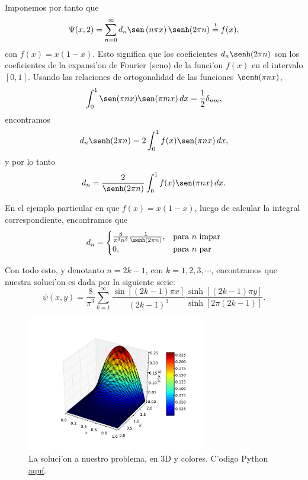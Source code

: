 Imponemos por tanto que
\begin{equation}
\Psi(x,2) = \sum_{n=0}^\infty d_n \sen\left(n\pi x\right)\senh(2\pi n) \stackrel{!}{=} f(x),
\end{equation}
con $f(x)=x(1-x)$. Esto significa que los coeficientes $d_n\senh(2\pi n)$ son los coeficientes de la expansi'on de Fourier (seno) de la funci'on $f(x)$ en el intervalo $[0,1]$. Usando las relaciones de ortogonalidad de las funciones $\senh(\pi nx)$, 
\begin{equation}
\int_0^1 \sen(\pi nx)\sen(\pi mx)\,dx = \frac{1}{2}\delta_{nm},
\end{equation}
encontramos
\begin{equation}
d_n\senh(2\pi n) = 2 \int_0^1 f(x)\sen(\pi nx)\,dx,
\end{equation}
y por lo tanto
\begin{equation}
d_n = \frac{2}{\senh(2\pi n)} \int_0^1 f(x)\sen(\pi nx)\,dx.
\end{equation}

En el ejemplo particular en que $f(x)=x(1-x)$, luego de calcular la integral correspondiente, encontramos que
\begin{equation}
d_n = \begin{cases}
	\frac{8}{\pi^3n^3}\frac{1}{\senh(2\pi n)} , & \text{para } n \text{ impar} \\
	0 , & \text{para } n \text{ par} \end{cases}
\end{equation}

Con todo esto, y denotanto $n=2k-1$, con $k=1,2,3,\cdots$, encontramos que nuestra soluci'on es dada por la siguiente serie:
\begin{equation}
\psi(x,y)=\frac{8}{\pi^3}\sum_{k=1}^{\infty}\frac{\sin[(2k-1) \pi x]}{(2k-1)^3}\frac{\sinh[(2k-1)\pi y]}{\sinh[2\pi (2k-1)]}.
\end{equation}

\begin{figure}[H]
\centering
\includegraphics[angle=0,width=0.7\textwidth]{figs/fig-MSV-rectangulo-3D.pdf}
\caption{La soluci'on a nuestro problema, en 3D y colores. C'odigo Python \href{https://github.com/gfrubi/FM2/blob/master/figuras-editables/fig-MSV-Laplace-rectangulo.py}{aqu\'i}.}
\label{fig-SolLap}
\end{figure}

